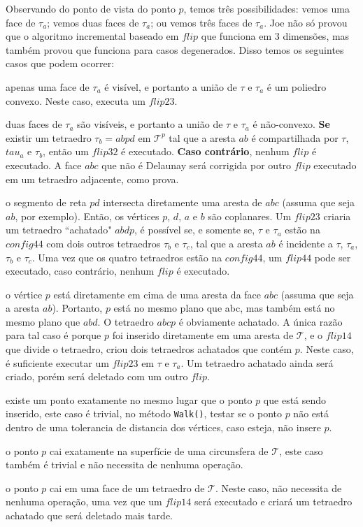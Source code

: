 Observando do ponto de vista do ponto $p$, temos três possibilidades: vemos
uma face de $\tau_a$; vemos duas faces de $\tau_a$; ou vemos três faces de
$\tau_a$. Joe \cite{Joe1989} não só provou que o algoritmo incremental baseado
em $flip$ que funciona em 3 dimensões, mas também provou que funciona para
casos degenerados. Disso temos os seguintes casos que podem ocorrer:

\begin{Casos}
    \item apenas uma face de $\tau_a$ é visível, e portanto a união de 
    $\tau$ e $\tau_a$ é um poliedro convexo. Neste caso, executa um 
    $flip23$.
    \item duas faces de $\tau_a$ são visíveis, e portanto a união de 
    $\tau$ e $\tau_a$ é não-convexo. \textbf{Se} existir um tetraedro $\tau_b = abpd$
    em $\mathcal{T}^p$ tal que a aresta $ab$ é compartilhada por $\tau$,
    $tau_a$ e $\tau_b$, então um $flip32$ é executado. \textbf{Caso contrário},
    nenhum $flip$ é executado. A face $abc$ que não é Delaunay será corrigida
    por outro $flip$ executado em um tetraedro adjacente, como \cite{Joe1991}
    prova.
    \item o segmento de reta $pd$ intersecta diretamente uma aresta de $abc$ 
    (assuma que seja $ab$, por exemplo). Então, os vértices $p$, $d$, $a$ e 
    $b$ são coplanares. Um $flip23$ criaria um tetraedro ``achatado" $abdp$,
    é possível se, e somente se, $\tau$ e $\tau_a$ estão na $config44$ com dois
    outros tetraedros $\tau_b$ e $\tau_c$, tal que a aresta $ab$ é incidente a
    $\tau$, $\tau_a$, $\tau_b$ e $\tau_c$. Uma vez que os quatro tetraedros estão
    na $config44$, um $flip44$ pode ser executado, caso contrário, nenhum $flip$
    é executado.
    \item o vértice $p$ está diretamente em cima de uma aresta da face $abc$ (assuma 
    que seja a aresta $ab$). Portanto, $p$ está no mesmo plano que abc, mas também
    está no mesmo plano que $abd$. O tetraedro $abcp$ é obviamente achatado. A única 
    razão para tal caso é porque $p$ foi inserido diretamente em uma aresta de $\mathcal{T}$,
    e o $flip14$ que divide o tetraedro, criou dois tetraedros achatados que contém $p$.
    Neste caso, é suficiente executar um $flip23$ em $\tau$ e $\tau_a$. Um tetraedro 
    achatado ainda será criado, porém será deletado com um outro $flip$.
    \item existe um ponto exatamente no mesmo lugar que o ponto $p$ que está sendo inserido,
    este caso é trivial, no método \texttt{Walk()}, testar se o ponto $p$ não está
    dentro de uma tolerancia de distancia dos vértices, caso esteja, não insere $p$.
    \item o ponto $p$ cai exatamente na superfície de uma circunsfera de $\mathcal{T}$,
    este caso também é trivial e não necessita de nenhuma operação.
    \item o ponto $p$ cai em uma face de um tetraedro de $\mathcal{T}$. Neste caso, 
    não necessita de nenhuma operação, uma vez que um $flip14$ será executado e criará
    um tetraedro achatado que será deletado mais tarde. 
\end{Casos}

